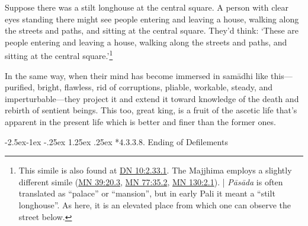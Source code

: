 \documentclass[12pt,openany]{book}%
\makeatletter
\renewcommand\paragraph{\@startsection{paragraph}{4}{\z@}%
            {-2.5ex\@plus -1ex \@minus -.25ex}%
            {1.25ex \@plus .25ex}%
            {\noindent\normalfont\itshape\small}}
\makeatother
\begin{document}
Suppose there was a stilt longhouse at the central square. A person with clear eyes standing there might see people entering and leaving a house, walking along the streets and paths, and sitting at the central square. They’d think: ‘These are people entering and leaving a house, walking along the streets and paths, and sitting at the central square.’\footnote{This simile is also found at \href{https://suttacentral.net/dn10/en/sujato\#2.33.1}{DN 10:2.33.1}. The Majjhima employs a slightly different simile (\href{https://suttacentral.net/mn39/en/sujato\#20.3}{MN 39:20.3}, \href{https://suttacentral.net/mn77/en/sujato\#35.2}{MN 77:35.2}, \href{https://suttacentral.net/mn130/en/sujato\#2.1}{MN 130:2.1}). | \textit{\textsanskrit{Pāsāda}} is often translated as “palace” or “mansion”, but in early Pali it meant a “stilt longhouse”. As here, it is an elevated place from which one can observe the street below. } 

In the same way, when their mind has become immersed in \textsanskrit{samādhi} like this—purified, bright, flawless, rid of corruptions, pliable, workable, steady, and imperturbable—they project it and extend it toward knowledge of the death and rebirth of sentient beings. This too, great king, is a fruit of the ascetic life that’s apparent in the present life which is better and finer than the former ones. 

\paragraph*{4.3.3.8. Ending of Defilements }
\end{document}
